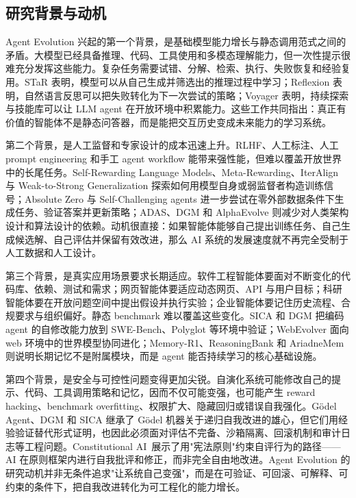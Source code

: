 \subsection{研究背景与动机}\label{sec:intro-motivation}

Agent Evolution 兴起的第一个背景，是基础模型能力增长与静态调用范式之间的矛盾。大模型已经具备推理、代码、工具使用和多模态理解能力，但一次性提示很难充分发挥这些能力。复杂任务需要试错、分解、检索、执行、失败恢复和经验复用。STaR 表明，模型可以从自己生成并筛选出的推理过程中学习；Reflexion 表明，自然语言反思可以把失败转化为下一次尝试的策略；Voyager 表明，持续探索与技能库可以让 LLM agent 在开放环境中积累能力。这些工作共同指出：真正有价值的智能体不是静态问答器，而是能把交互历史变成未来能力的学习系统。

第二个背景，是人工监督和专家设计的成本迅速上升。RLHF、人工标注、人工 prompt engineering 和手工 agent workflow 能带来强性能，但难以覆盖开放世界中的长尾任务。Self-Rewarding Language Models、Meta-Rewarding、IterAlign 与 Weak-to-Strong Generalization 探索如何用模型自身或弱监督者构造训练信号；Absolute Zero 与 Self-Challenging agents 进一步尝试在零外部数据条件下生成任务、验证答案并更新策略；ADAS、DGM 和 AlphaEvolve 则减少对人类架构设计和算法设计的依赖。动机很直接：如果智能体能够自己提出训练任务、自己生成候选解、自己评估并保留有效改进，那么 AI 系统的发展速度就不再完全受制于人工数据和人工设计。

第三个背景，是真实应用场景要求长期适应。软件工程智能体要面对不断变化的代码库、依赖、测试和需求；网页智能体要适应动态网页、API 与用户目标；科研智能体要在开放问题空间中提出假设并执行实验；企业智能体要记住历史流程、合规要求与组织偏好。静态 benchmark 难以覆盖这些变化。SICA 和 DGM 把编码 agent 的自修改能力放到 SWE-Bench、Polyglot 等环境中验证；WebEvolver 面向 web 环境中的世界模型协同进化；Memory-R1、ReasoningBank 和 AriadneMem 则说明长期记忆不是附属模块，而是 agent 能否持续学习的核心基础设施。

第四个背景，是安全与可控性问题变得更加尖锐。自演化系统可能修改自己的提示、代码、工具调用策略和记忆，因而不仅可能变强，也可能产生 reward hacking、benchmark overfitting、权限扩大、隐藏回归或错误自我强化。Gödel Agent、DGM 和 SICA 继承了 Gödel 机器关于递归自我改进的雄心，但它们用经验验证替代形式证明，也因此必须面对评估不完备、沙箱隔离、回滚机制和审计日志等工程问题。Constitutional AI~\citep{constitutionalai2022}展示了用"宪法原则"约束自评行为的路径——AI 在原则框架内进行自我批评和修正，而非完全自由地改进。Agent Evolution 的研究动机并非无条件追求"让系统自己变强"，而是在可验证、可回滚、可解释、可约束的条件下，把自我改进转化为可工程化的能力增长。

